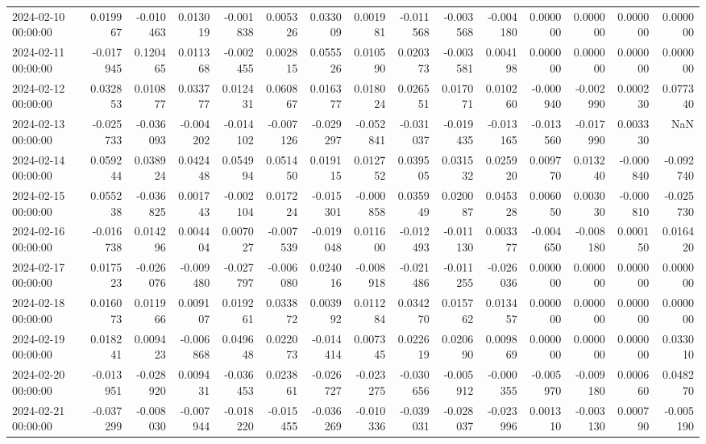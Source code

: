 \begin{tabular}{lrrrrrrrrrrrrrr}
2024-02-10 00:00:00 & 0.019967 & -0.010463 & 0.013019 & -0.001838 & 0.005326 & 0.033009 & 0.001981 & -0.011568 & -0.003568 & -0.004180 & 0.000000 & 0.000000 & 0.000000 & 0.000000 \\
2024-02-11 00:00:00 & -0.017945 & 0.120465 & 0.011368 & -0.002455 & 0.002815 & 0.055526 & 0.010590 & 0.020373 & -0.003581 & 0.004198 & 0.000000 & 0.000000 & 0.000000 & 0.000000 \\
2024-02-12 00:00:00 & 0.032853 & 0.010877 & 0.033777 & 0.012431 & 0.060867 & 0.016377 & 0.018024 & 0.026551 & 0.017071 & 0.010260 & -0.000940 & -0.002990 & 0.000230 & 0.077340 \\
2024-02-13 00:00:00 & -0.025733 & -0.036093 & -0.004202 & -0.014102 & -0.007126 & -0.029297 & -0.052841 & -0.031037 & -0.019435 & -0.013165 & -0.013560 & -0.017990 & 0.003330 & NaN \\
2024-02-14 00:00:00 & 0.059244 & 0.038924 & 0.042448 & 0.054994 & 0.051450 & 0.019115 & 0.012752 & 0.039505 & 0.031532 & 0.025920 & 0.009770 & 0.013240 & -0.000840 & -0.092740 \\
2024-02-15 00:00:00 & 0.055238 & -0.036825 & 0.001743 & -0.002104 & 0.017224 & -0.015301 & -0.000858 & 0.035949 & 0.020087 & 0.045328 & 0.006050 & 0.003030 & -0.000810 & -0.025730 \\
2024-02-16 00:00:00 & -0.016738 & 0.014296 & 0.004404 & 0.007027 & -0.007539 & -0.019048 & 0.011600 & -0.012493 & -0.011130 & 0.003377 & -0.004650 & -0.008180 & 0.000150 & 0.016420 \\
2024-02-17 00:00:00 & 0.017523 & -0.026076 & -0.009480 & -0.027797 & -0.006080 & 0.024016 & -0.008918 & -0.021486 & -0.011255 & -0.026036 & 0.000000 & 0.000000 & 0.000000 & 0.000000 \\
2024-02-18 00:00:00 & 0.016073 & 0.011966 & 0.009107 & 0.019261 & 0.033872 & 0.003992 & 0.011284 & 0.034270 & 0.015762 & 0.013457 & 0.000000 & 0.000000 & 0.000000 & 0.000000 \\
2024-02-19 00:00:00 & 0.018241 & 0.009423 & -0.006868 & 0.049648 & 0.022073 & -0.014414 & 0.007345 & 0.022619 & 0.020690 & 0.009869 & 0.000000 & 0.000000 & 0.000000 & 0.033010 \\
2024-02-20 00:00:00 & -0.013951 & -0.028920 & 0.009431 & -0.036453 & 0.023861 & -0.026727 & -0.023275 & -0.030656 & -0.005912 & -0.000355 & -0.005970 & -0.009180 & 0.000660 & 0.048270 \\
2024-02-21 00:00:00 & -0.037299 & -0.008030 & -0.007944 & -0.018220 & -0.015455 & -0.036269 & -0.010336 & -0.039031 & -0.028037 & -0.023996 & 0.001310 & -0.003130 & 0.000790 & -0.005190 \\

\end{tabular}
